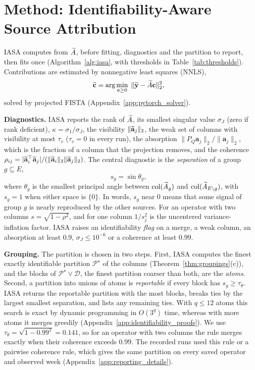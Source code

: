 \section{Method: Identifiability-Aware Source Attribution}
\label{sec:method}
\label{sec:iasa_procedure}

IASA computes from \(\widetilde A\), before fitting, diagnostics and the partition to report,
then fits once (Algorithm~\ref{alg:iasa}, with thresholds in Table~\ref{tab:thresholds}).
Contributions are estimated by nonnegative least squares (NNLS),
\begin{equation}
\widehat{\mathbf c}=\arg\min_{\mathbf c\ge 0}\;\|\widetilde{\mathbf y}-\widetilde A\mathbf c\|_2^2,
\label{eq:nnls_estimator}
\end{equation}
solved by projected FISTA \citep{beck2009fast} (Appendix~\ref{app:pytorch_solver}).

\noindent\textbf{Diagnostics.}
IASA reports the rank of \(\widetilde A\), its smallest singular value \(\sigma_J\) (zero if rank
deficient), \(\kappa=\sigma_1/\sigma_J\), the visibility \(\|\widetilde{\mathbf a}_j\|_2\), the weak set of
columns with visibility at most \(\tau_v\) (\(\tau_v=0\) in every run), the absorption
\(\|P_Q\mathbf a_j\|_2/\|\mathbf a_j\|_2\), which is the fraction of a column that the
projection removes, and the coherence
\(\rho_{ij}=|\widetilde{\mathbf a}_i^\top\widetilde{\mathbf a}_j|/(\|\widetilde{\mathbf a}_i\|_2\|\widetilde{\mathbf a}_j\|_2)\).  The
central diagnostic is the \emph{separation} of a group \(g\subseteq E\),
\begin{equation}
s_g=\sin\theta_g ,
\label{eq:separation}
\end{equation}
where \(\theta_g\) is the smallest principal angle \citep{bjorck1973numerical} between
\(\operatorname{col}(\widetilde A_g)\) and \(\operatorname{col}(\widetilde A_{E\setminus g})\), with
\(s_g=1\) when either space is \(\{0\}\).  In words, \(s_g\) near \(0\) means that some signal of group \(g\) is nearly reproduced
by the other sources.  For an operator with two columns \(s=\sqrt{1-\rho^2}\), and for one
column \(1/s_j^2\) is the uncentered variance-inflation factor.  IASA raises an identifiability
\emph{flag} on a merge, a weak column, an absorption at least \(0.9\),
\(\sigma_J\le10^{-6}\) or a coherence at least \(0.99\).

\noindent\textbf{Grouping.}
The partition is chosen in two steps.  First, IASA computes the finest exactly
identifiable partition \(\mathcal P^\star\) of the columns
(Theorem~\ref{thm:groupings}(c)), and the blocks of \(\mathcal P^\star\vee\mathcal D\), the
finest partition coarser than both, are the \emph{atoms}.  Second, a partition into
unions of atoms is \emph{reportable} if every block has \(s_g\ge\tau_\theta\).  IASA
returns the reportable partition with the most blocks, breaks ties by the largest
smallest separation, and lists any remaining ties.  With \(q\le12\) atoms this search is
exact by dynamic programming in \(O(3^q)\) time, whereas with more atoms it merges greedily
(Appendix~\ref{app:identifiability_proofs}).  We use \(\tau_\theta=\sqrt{1-0.99^2}=0.141\),
so for an operator with two columns the rule merges exactly when their coherence
exceeds \(0.99\).  The recorded runs used this rule or a pairwise coherence rule, which gives the same
partition on every saved operator and observed week (Appendix~\ref{app:reporting_details}).

